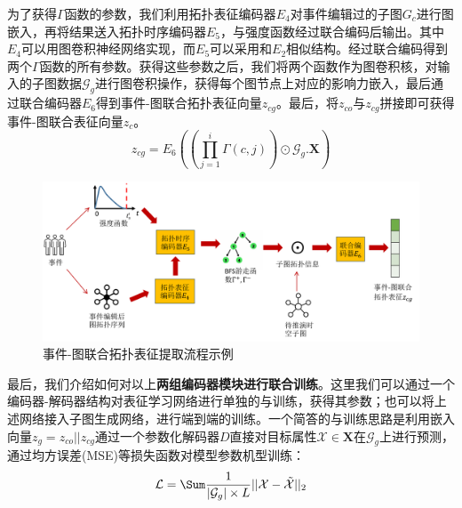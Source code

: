 \documentclass[12pt,UTF8,AutoFakeBold=2,a4paper]{ctexart} %
\begin{document}
为了获得$\Gamma$函数的参数，我们利用拓扑表征编码器$E_4$对事件编辑过的子图$G_c$进行图嵌入，再将结果送入拓扑时序编码器$E_5$，与强度函数经过联合编码后输出。其中$E_4$可以用图卷积神经网络实现，而$E_5$可以采用和$E_2$相似结构。经过联合编码得到两个$\Gamma$函数的所有参数。获得这些参数之后，我们将两个函数作为图卷积核，对输入的子图数据$\mathcal{G}_g$进行图卷积操作，获得每个图节点上对应的影响力嵌入，最后通过联合编码器$E_6$得到事件-图联合拓扑表征向量$z_{cg}$。最后，将$z_{co}$与$z_{cg}$拼接即可获得事件-图联合表征向量$z_c$。
\begin{equation}
z_{cg} = E_6((\prod_{j=1}^{i}\Gamma(c,j)) \odot \mathcal{G}_g.\mathbf{X})
\end{equation}
\begin{figure}
    \centering
    \includegraphics[width=1\linewidth]{fig/topo-embed.png}
    \caption{事件-图联合拓扑表征提取流程示例}
    \label{fig:embed-bfs}
\end{figure}
最后，我们介绍如何对以上\textbf{两组编码器模块进行联合训练}。这里我们可以通过一个编码器-解码器结构对表征学习网络进行单独的与训练，获得其参数；也可以将上述网络接入子图生成网络，进行端到端的训练。一个简答的与训练思路是利用嵌入向量$z_g = z_{co}||z_{cg}$通过一个参数化解码器$D$直接对目标属性$\mathcal{X}\in \mathbf{X}$在$\mathcal{G}_g$上进行预测，通过均方误差(MSE)等损失函数对模型参数机型训练：
\begin{equation}
    \mathcal{L} = \Sum\frac{1}{|\mathcal{G}_g|\times L}||\mathcal{X} - \tilde{\mathcal{X}}||_2
\end{equation}
\end{document}

